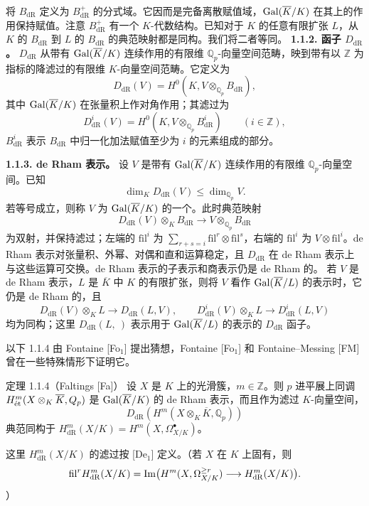 将 $B_{\mathrm{dR}}$ 定义为 $B^+_{\mathrm{dR}}$ 的分式域。它因而是完备离散赋值域，$\operatorname{Gal}(\overline K/K)$ 在其上的作用保持赋值。注意 $B^+_{\mathrm{dR}}$ 有一个 $K$-代数结构。已知对于 $K$ 的任意有限扩张 $L$，从 $K$ 的 $B_{\mathrm{dR}}$ 到 $L$ 的 $B_{\mathrm{dR}}$ 的典范映射都是同构。我们将二者等同。
\textbf{1.1.2. 函子 $D_{\mathrm{dR}}$。} $D_{\mathrm{dR}}$ 从带有 $\operatorname{Gal}(\overline K/K)$ 连续作用的有限维 $\mathbb Q_p$-向量空间范畴，映到带有以 $\mathbb Z$ 为指标的降滤过的有限维 $K$-向量空间范畴。它定义为
\[
 D_{\mathrm{dR}}(V)=H^0(K,V\otimes_{\mathbb Q_p}B_{\mathrm{dR}}),
\]
其中 $\operatorname{Gal}(\overline K/K)$ 在张量积上作对角作用；其滤过为
\[
 D^i_{\mathrm{dR}}(V)=H^0(K,V\otimes_{\mathbb Q_p}B^i_{\mathrm{dR}})\qquad(i\in\mathbb Z),
\]
$B^i_{\mathrm{dR}}$ 表示 $B_{\mathrm{dR}}$ 中归一化加法赋值至少为 $i$ 的元素组成的部分。

\textbf{1.1.3. de Rham 表示。} 设 $V$ 是带有 $\operatorname{Gal}(\overline K/K)$ 连续作用的有限维 $\mathbb Q_p$-向量空间。已知
\[
 \dim_KD_{\mathrm{dR}}(V)\le\dim_{\mathbb Q_p}V.
\]
若等号成立，则称 $V$ 为 $\operatorname{Gal}(\overline K/K)$ 的一个。此时典范映射
\[
 D_{\mathrm{dR}}(V)\otimes_K B_{\mathrm{dR}}\longrightarrow V\otimes_{\mathbb Q_p}B_{\mathrm{dR}}
\]
为双射，并保持滤过；左端的 $\mathrm{fil}^i$ 为 $\sum_{r+s=i}\mathrm{fil}^r\otimes\mathrm{fil}^s$，右端的 $\mathrm{fil}^i$ 为 $V\otimes\mathrm{fil}^i$。de Rham 表示对张量积、外幂、对偶和直和运算稳定，且 $D_{\mathrm{dR}}$ 在 de Rham 表示上与这些运算可交换。de Rham 表示的子表示和商表示仍是 de Rham 的。
若 $V$ 是 de Rham 表示，$L$ 是 $\overline K$ 中 $K$ 的有限扩张，则将 $V$ 看作 $\operatorname{Gal}(\overline K/L)$ 的表示时，它仍是 de Rham 的，且
\[
 D_{\mathrm{dR}}(V)\otimes_K L\longrightarrow D_{\mathrm{dR}}(L,V),\qquad
 D^i_{\mathrm{dR}}(V)\otimes_K L\longrightarrow D^i_{\mathrm{dR}}(L,V)
\]
均为同构；这里 $D_{\mathrm{dR}}(L,\ )$ 表示用于 $\operatorname{Gal}(\overline K/L)$ 的表示的 $D_{\mathrm{dR}}$ 函子。

以下 1.1.4 由 Fontaine [Fo$_1$] 提出猜想，Fontaine [Fo$_1$] 和 Fontaine--Messing [FM] 曾在一些特殊情形下证明它。
\begin{statement}{定理 1.1.4（Faltings [Fa]）}
设 $X$ 是 $K$ 上的光滑簇，$m\in\mathbb Z$。则 $p$ 进平展上同调 $H^m_{\mathrm{\acute et}}(X\otimes_K\overline K,Q_p)$ 是 $\operatorname{Gal}(\overline K/K)$ 的 de Rham 表示，而且作为滤过 $K$-向量空间，
\[
 D_{\mathrm{dR}}(H^m(X\otimes_K\overline K,\mathbb Q_p))
\]
典范同构于
$H^m_{\mathrm{dR}}(X/K)=H^m(X,\Omega^\bullet_{X/K})$。
\end{statement}
这里 $H^m_{\mathrm{dR}}(X/K)$ 的滤过按 [De$_1$] 定义。（若 $X$ 在 $K$ 上固有，则
\[
 \mathrm{fil}^r H^m_{\mathrm{dR}}(X/K)=\operatorname{Im}\bigl(H^m(X,\Omega^{\ge r}_{X/K})\longrightarrow H^m_{\mathrm{dR}}(X/K)\bigr).
\]
）

